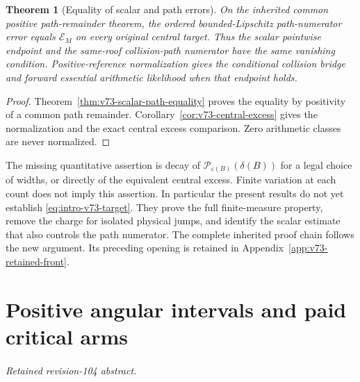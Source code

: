 \documentclass[11pt,reqno]{amsart}
\numberwithin{equation}{section}
\newtheorem{revisiontheorem}{Theorem}
\theoremstyle{definition}\newtheorem{definition}[theorem]{Definition}
\theoremstyle{remark}\newtheorem{remark}[theorem]{Remark}
\theoremstyle{definition}\newtheorem{inputstatement}[theorem]{Input statement}
\begin{document}
\begin{revisiontheorem}[Equality of scalar and path errors]
\label{thm:intro-v73-path}
On the inherited common positive path-remainder theorem, the ordered
bounded-Lipschitz path-numerator error equals $\mathcal E_M$ on every
original central target. Thus the scalar pointwise endpoint and the
same-roof collision-path numerator have the same vanishing condition.
Positive-reference normalization gives the conditional collision bridge
and forward essential arithmetic likelihood when that endpoint holds.
\end{revisiontheorem}
\begin{proof}
Theorem~\ref{thm:v73-scalar-path-equality} proves the equality by
positivity of a common path remainder. Corollary~\ref{cor:v73-central-excess}
gives the normalization and the exact central excess comparison.
Zero arithmetic classes are never normalized.
\end{proof}

The missing quantitative assertion is decay of
$\mathcal P_{\varepsilon(B)}(\delta(B))$ for a legal choice of widths,
or directly of the equivalent central excess. Finite variation at each
count does not imply this assertion. In particular the present results
do not yet establish \eqref{eq:intro-v73-target}. They prove the full
finite-measure property, remove the charge for isolated physical jumps,
and identify the scalar estimate that also controls the path numerator.
The complete inherited proof chain follows the new argument. Its
preceding opening is retained in Appendix~\ref{app:v73-retained-front}.






\part{Positive angular intervals and paid critical arms}
\begingroup
\let\ArchiveLabel\label
\let\ArchiveRef\ref
\renewcommand{\label}[1]{\ArchiveLabel{v104archive:#1}}
\renewcommand{\ref}[1]{%
  \IfBeginWith{#1}{supp-}{%
    \StrBehind{#1}{supp-}[\ArchiveTarget]%
    \ArchiveRef{\ArchiveTarget}%
  }{\ArchiveRef{v104archive:#1}}%
}
\makeatletter
\let\ltx@label\label
\makeatother
\paragraph{Retained revision-104 abstract.}
\end{document}
